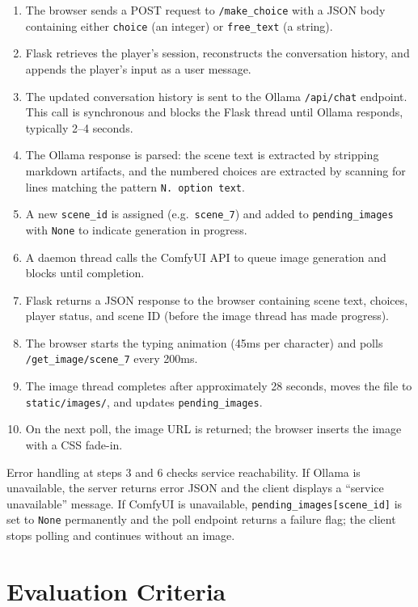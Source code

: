 \documentclass[12pt,a4paper]{article}
\begin{document}
\begin{enumerate}
    \item The browser sends a POST request to \texttt{/make\_choice} with a JSON body containing either \texttt{choice} (an integer) or \texttt{free\_text} (a string).
    \item Flask retrieves the player's session, reconstructs the conversation history, and appends the player's input as a user message.
    \item The updated conversation history is sent to the Ollama \texttt{/api/chat} endpoint. This call is synchronous and blocks the Flask thread until Ollama responds, typically 2--4 seconds.
    \item The Ollama response is parsed: the scene text is extracted by stripping markdown artifacts, and the numbered choices are extracted by scanning for lines matching the pattern \texttt{N. option text}.
    \item A new \texttt{scene\_id} is assigned (e.g.\ \texttt{scene\_7}) and added to \texttt{pending\_images} with \texttt{None} to indicate generation in progress.
    \item A daemon thread calls the ComfyUI API to queue image generation and blocks until completion.
    \item Flask returns a JSON response to the browser containing scene text, choices, player status, and scene ID (before the image thread has made progress).
    \item The browser starts the typing animation (45ms per character) and polls \texttt{/get\_image/scene\_7} every 200ms.
    \item The image thread completes after approximately 28 seconds, moves the file to \texttt{static/images/}, and updates \texttt{pending\_images}.
    \item On the next poll, the image URL is returned; the browser inserts the image with a CSS fade-in.
\end{enumerate}

Error handling at steps 3 and 6 checks service reachability. If Ollama is unavailable, the server returns error JSON and the client displays a ``service unavailable'' message. If ComfyUI is unavailable, \texttt{pending\_images[scene\_id]} is set to \texttt{None} permanently and the poll endpoint returns a failure flag; the client stops polling and continues without an image.

\section{Evaluation Criteria}
\end{document}
